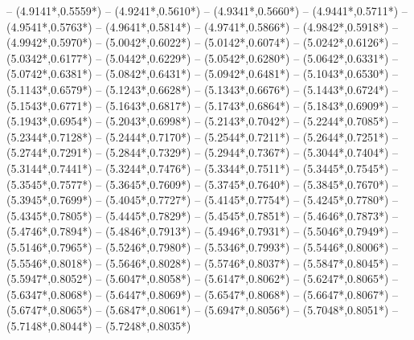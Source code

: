 {	-- ({4.9141*\dx},{0.5559*\dy})
	-- ({4.9241*\dx},{0.5610*\dy})
	-- ({4.9341*\dx},{0.5660*\dy})
	-- ({4.9441*\dx},{0.5711*\dy})
	-- ({4.9541*\dx},{0.5763*\dy})
	-- ({4.9641*\dx},{0.5814*\dy})
	-- ({4.9741*\dx},{0.5866*\dy})
	-- ({4.9842*\dx},{0.5918*\dy})
	-- ({4.9942*\dx},{0.5970*\dy})
	-- ({5.0042*\dx},{0.6022*\dy})
	-- ({5.0142*\dx},{0.6074*\dy})
	-- ({5.0242*\dx},{0.6126*\dy})
	-- ({5.0342*\dx},{0.6177*\dy})
	-- ({5.0442*\dx},{0.6229*\dy})
	-- ({5.0542*\dx},{0.6280*\dy})
	-- ({5.0642*\dx},{0.6331*\dy})
	-- ({5.0742*\dx},{0.6381*\dy})
	-- ({5.0842*\dx},{0.6431*\dy})
	-- ({5.0942*\dx},{0.6481*\dy})
	-- ({5.1043*\dx},{0.6530*\dy})
	-- ({5.1143*\dx},{0.6579*\dy})
	-- ({5.1243*\dx},{0.6628*\dy})
	-- ({5.1343*\dx},{0.6676*\dy})
	-- ({5.1443*\dx},{0.6724*\dy})
	-- ({5.1543*\dx},{0.6771*\dy})
	-- ({5.1643*\dx},{0.6817*\dy})
	-- ({5.1743*\dx},{0.6864*\dy})
	-- ({5.1843*\dx},{0.6909*\dy})
	-- ({5.1943*\dx},{0.6954*\dy})
	-- ({5.2043*\dx},{0.6998*\dy})
	-- ({5.2143*\dx},{0.7042*\dy})
	-- ({5.2244*\dx},{0.7085*\dy})
	-- ({5.2344*\dx},{0.7128*\dy})
	-- ({5.2444*\dx},{0.7170*\dy})
	-- ({5.2544*\dx},{0.7211*\dy})
	-- ({5.2644*\dx},{0.7251*\dy})
	-- ({5.2744*\dx},{0.7291*\dy})
	-- ({5.2844*\dx},{0.7329*\dy})
	-- ({5.2944*\dx},{0.7367*\dy})
	-- ({5.3044*\dx},{0.7404*\dy})
	-- ({5.3144*\dx},{0.7441*\dy})
	-- ({5.3244*\dx},{0.7476*\dy})
	-- ({5.3344*\dx},{0.7511*\dy})
	-- ({5.3445*\dx},{0.7545*\dy})
	-- ({5.3545*\dx},{0.7577*\dy})
	-- ({5.3645*\dx},{0.7609*\dy})
	-- ({5.3745*\dx},{0.7640*\dy})
	-- ({5.3845*\dx},{0.7670*\dy})
	-- ({5.3945*\dx},{0.7699*\dy})
	-- ({5.4045*\dx},{0.7727*\dy})
	-- ({5.4145*\dx},{0.7754*\dy})
	-- ({5.4245*\dx},{0.7780*\dy})
	-- ({5.4345*\dx},{0.7805*\dy})
	-- ({5.4445*\dx},{0.7829*\dy})
	-- ({5.4545*\dx},{0.7851*\dy})
	-- ({5.4646*\dx},{0.7873*\dy})
	-- ({5.4746*\dx},{0.7894*\dy})
	-- ({5.4846*\dx},{0.7913*\dy})
	-- ({5.4946*\dx},{0.7931*\dy})
	-- ({5.5046*\dx},{0.7949*\dy})
	-- ({5.5146*\dx},{0.7965*\dy})
	-- ({5.5246*\dx},{0.7980*\dy})
	-- ({5.5346*\dx},{0.7993*\dy})
	-- ({5.5446*\dx},{0.8006*\dy})
	-- ({5.5546*\dx},{0.8018*\dy})
	-- ({5.5646*\dx},{0.8028*\dy})
	-- ({5.5746*\dx},{0.8037*\dy})
	-- ({5.5847*\dx},{0.8045*\dy})
	-- ({5.5947*\dx},{0.8052*\dy})
	-- ({5.6047*\dx},{0.8058*\dy})
	-- ({5.6147*\dx},{0.8062*\dy})
	-- ({5.6247*\dx},{0.8065*\dy})
	-- ({5.6347*\dx},{0.8068*\dy})
	-- ({5.6447*\dx},{0.8069*\dy})
	-- ({5.6547*\dx},{0.8068*\dy})
	-- ({5.6647*\dx},{0.8067*\dy})
	-- ({5.6747*\dx},{0.8065*\dy})
	-- ({5.6847*\dx},{0.8061*\dy})
	-- ({5.6947*\dx},{0.8056*\dy})
	-- ({5.7048*\dx},{0.8051*\dy})
	-- ({5.7148*\dx},{0.8044*\dy})
	-- ({5.7248*\dx},{0.8035*\dy})
}
